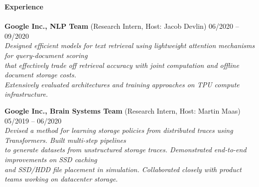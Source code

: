 \documentclass{article}
\begin{document}
\noindent
\textbf{{\Large Experience}}\\[-2mm]
\HRule\\
\textbf{Google Inc., NLP Team} (Research Intern, Host: Jacob Devlin)
\hfill 06/2020 -- 09/2020\\
\indent
\hspace{-2.5mm}
\textit{Designed efficient models for text retrieval using lightweight attention mechanisms for query-document scoring} \\
\indent
\hspace{-2.5mm}
\textit{that effectively trade off retrieval accuracy with joint computation and offline document storage costs. } \\
\indent
\hspace{-2.5mm}
\textit{Extensively evaluated architectures and training approaches on TPU compute infrastructure.} \\
\vspace{-3.5mm}

\noindent
\textbf{Google Inc., Brain Systems Team} (Research Intern, Host: Martin Maas)
\hfill 05/2019 -- 06/2020\\
\indent
\hspace{-2.5mm}
\textit{Devised a method for learning storage policies from distributed traces using Transformers. Built multi-step pipelines} \\
\indent
\hspace{-2.5mm}
\textit{to generate datasets from unstructured storage traces. Demonstrated end-to-end improvements on SSD caching} \\
\indent
\hspace{-2.5mm}
\textit{and SSD/HDD file placement in simulation. Collaborated closely with product teams working on datacenter storage.} \\
\vspace{-3.5mm}
\end{document}
